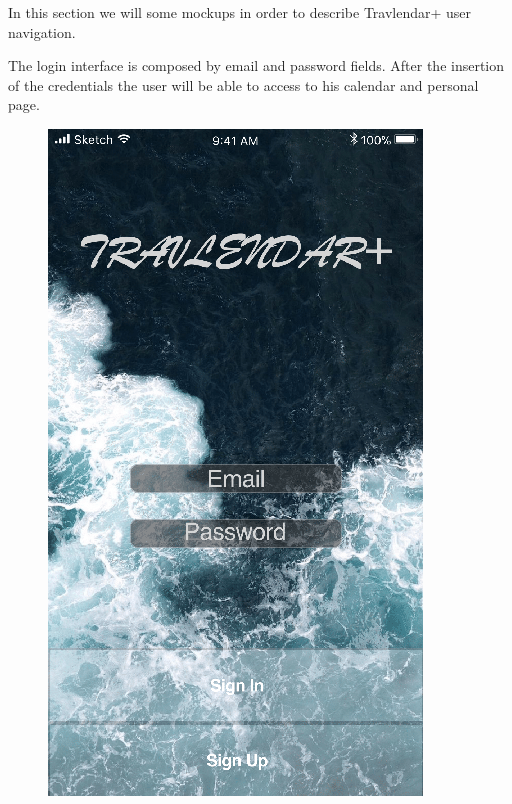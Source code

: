 In this section we will some mockups in order to describe Travlendar+ user navigation.

The login interface is composed by email and password fields. After the insertion of the credentials the user will be able to access to his calendar and personal page.
\begin{figure}[H]
	\centering
	\includegraphics[scale=0.23]{Images/Interface/Login/1_login_form}
	\hspace{0.5cm}

\end{figure}

